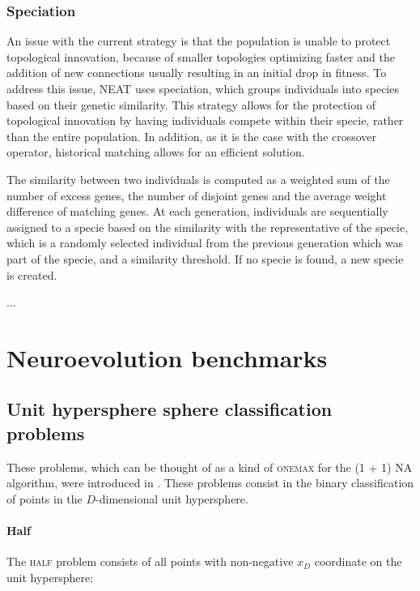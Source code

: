 
\subsubsection{Speciation}

An issue with the current strategy is that the population is unable to protect topological innovation, because of smaller topologies optimizing faster and the
addition of new connections usually resulting in an initial drop in fitness. To address this issue, NEAT uses speciation, which groups individuals into species based
on their genetic similarity. This strategy allows for the protection of topological innovation by having individuals compete within their specie, rather than the entire population.
In addition, as it is the case with the crossover operator, historical matching allows for an efficient solution.

The similarity between two individuals is computed as a weighted sum of the number of excess genes, the number of disjoint genes and the average weight difference
of matching genes. At each generation, individuals are sequentially assigned to a specie based on the similarity with the representative of the specie, which is
a randomly selected individual from the previous generation which was part of the specie, and a similarity threshold. If no specie is found, a new specie is created.

...


\section{Neuroevolution benchmarks}

\subsection{Unit hypersphere sphere classification problems}
\label{subsection:sphere_classification}


These problems, which can be thought of as a kind of \textsc{onemax} for the (1 + 1) NA algorithm, were introduced in \cite{na}.
These problems consist in the binary classification of points in the $D$-dimensional unit hypersphere.

\paragraph{Half}
The \textsc{half} problem consists of all points with non-negative $x_D$ coordinate on the unit hypersphere:

